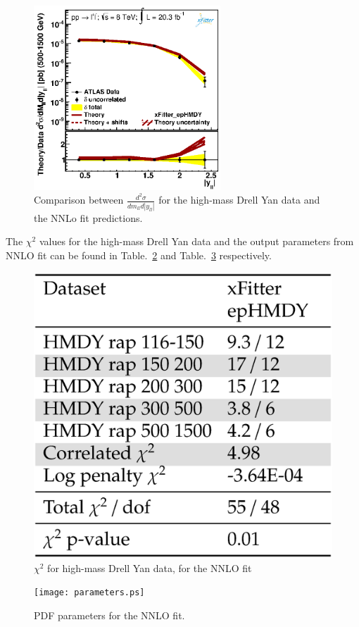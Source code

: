 \begin{figure}
\includegraphics[width=7cm]{data_5.ps} 
\caption{Comparison between $\frac{d^{2}\sigma}{dm_{ll}d|y_{ll}|}$ for the high-mass Drell Yan data and the NNLo fit predictions.}
\label{hmDY_2D}
\end{figure}
The $\chi^{2}$ values for the high-mass Drell Yan data and the output parameters from NNLO fit can be found in Table.~\ref{chi2_scan} 
and Table.~\ref{par_scan} 
respectively. 
\begin{figure}
\includegraphics[width=14cm]{chi2_hmDY.ps} 
\caption{$\chi^{2}$ for high-mass Drell Yan data, for the NNLO fit}
\label{chi2_scan}
\end{figure}
\begin{figure}
\texttt{[image: parameters.ps]} 
\caption{PDF parameters for the NNLO fit.}
\label{par_scan}
\end{figure}

